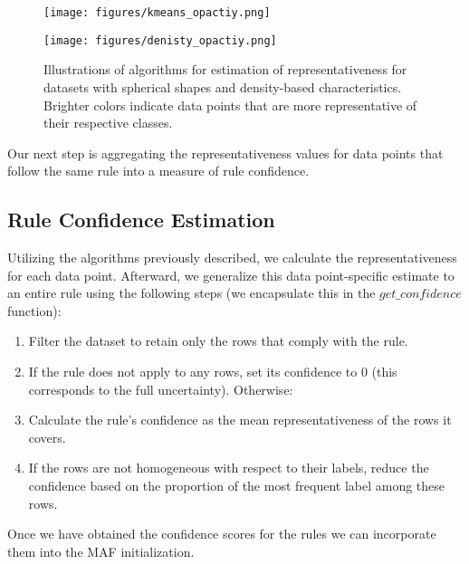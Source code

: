 \documentclass[10pt,a4paper,oneside]{article}
\begin{document}
\begin{figure}[H]
    \centering
    \begin{minipage}{0.49\textwidth}
        \texttt{[image: figures/kmeans\_opactiy.png]} %
    \end{minipage}\hfill
    \begin{minipage}{0.49\textwidth}
        \texttt{[image: figures/denisty\_opactiy.png]} %
    \end{minipage}
    \caption{Illustrations of algorithms for estimation of representativeness for datasets with spherical shapes and density-based characteristics. Brighter colors indicate data points that are more representative of their respective classes.}
    \label{fig:reprs}
\end{figure}

Our next step is aggregating the representativeness values for data points that follow the same rule into a measure of rule confidence.

\subsection{Rule Confidence Estimation}\label{2.3}
Utilizing the algorithms previously described, we calculate the representativeness for each data point. Afterward, we generalize this data point-specific estimate to an entire rule using the following steps (we encapsulate this in the $get\_confidence$ function):
\begin{enumerate}
    \item Filter the dataset to retain only the rows that comply with the rule.
    \item If the rule does not apply to any rows, set its confidence to 0 (this corresponds to the full uncertainty). Otherwise:
    \item Calculate the rule's confidence as the mean representativeness of the rows it covers.
    \item If the rows are not homogeneous with respect to their labels, reduce the confidence based on the proportion of the most frequent label among these rows.
\end{enumerate}

Once we have obtained the confidence scores for the rules we can incorporate them into the MAF initialization.
\end{document}
